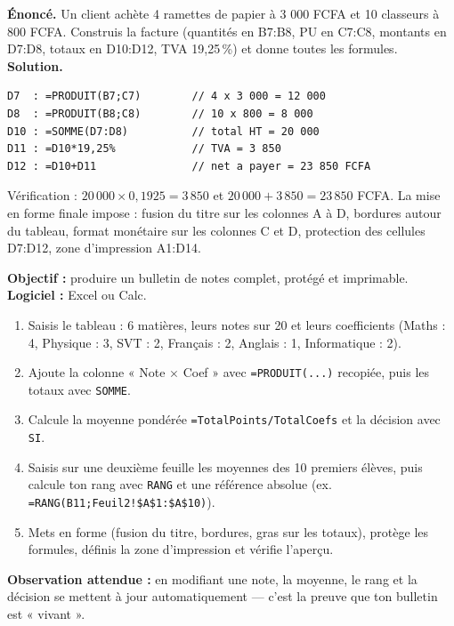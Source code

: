 \documentclass[11pt]{article}
\begin{document}
\begin{exoresolu}
\textbf{Énoncé.} Un client achète 4 ramettes de papier à 3 000 FCFA et 10 classeurs à 800 FCFA. Construis la facture (quantités en B7:B8, PU en C7:C8, montants en D7:D8, totaux en D10:D12, TVA 19,25\,\%) et donne toutes les formules.
\tcblower
\textbf{Solution.}
\begin{lstlisting}
D7  : =PRODUIT(B7;C7)        // 4 x 3 000 = 12 000
D8  : =PRODUIT(B8;C8)        // 10 x 800 = 8 000
D10 : =SOMME(D7:D8)          // total HT = 20 000
D11 : =D10*19,25%            // TVA = 3 850
D12 : =D10+D11               // net a payer = 23 850 FCFA
\end{lstlisting}
Vérification : $20\,000 \times 0{,}1925 = 3\,850$ et $20\,000 + 3\,850 = 23\,850$ FCFA. La mise en forme finale impose : fusion du titre sur les colonnes A à D, bordures autour du tableau, format monétaire sur les colonnes C et D, protection des cellules D7:D12, zone d'impression A1:D14.
\end{exoresolu}

\begin{experience}
\textbf{Objectif :} produire un bulletin de notes complet, protégé et imprimable. \textbf{Logiciel :} Excel ou Calc.
\begin{enumerate}
  \item Saisis le tableau : 6 matières, leurs notes sur 20 et leurs coefficients (Maths : 4, Physique : 3, SVT : 2, Français : 2, Anglais : 1, Informatique : 2).
  \item Ajoute la colonne « Note $\times$ Coef » avec \texttt{=PRODUIT(...)} recopiée, puis les totaux avec \texttt{SOMME}.
  \item Calcule la moyenne pondérée \texttt{=TotalPoints/TotalCoefs} et la décision avec \texttt{SI}.
  \item Saisis sur une deuxième feuille les moyennes des 10 premiers élèves, puis calcule ton rang avec \texttt{RANG} et une référence absolue (ex. \texttt{=RANG(B11;Feuil2!\$A\$1:\$A\$10)}).
  \item Mets en forme (fusion du titre, bordures, gras sur les totaux), protège les formules, définis la zone d'impression et vérifie l'aperçu.
\end{enumerate}
\textbf{Observation attendue :} en modifiant une note, la moyenne, le rang et la décision se mettent à jour automatiquement — c'est la preuve que ton bulletin est « vivant ».
\end{experience}
\end{document}
